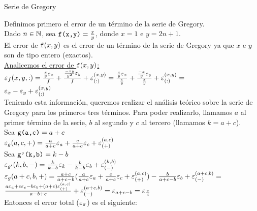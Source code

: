 \begin{section}{Serie de Gregory}

	\large
	
	Definimos primero el error de un término de la serie de Gregory.\\

	Dado $n \in \mathbb{N}$, sea $\texttt{f(x,y)}=\frac{x}{y}$, donde $x=1$ e $y=2n+1$.\\
	
	El error de $\texttt{f}(x,y)$ es el error de un término de la serie de Gregory ya que $x$ e $y$ son de tipo entero (exactos).\\
	
	\underline{Analicemos el error de $\texttt{f}(x,y)$:}\\
	
	$\texttt{$\varepsilon _{f}({x,y,:})$}=\frac{\frac{x}{y}\varepsilon _{x}}{f} + \frac{\frac{-xy}{y^2}\varepsilon _{y}}{f} + \varepsilon _{({:})}^{({x,y})} = 
	\frac{\frac{x}{y}\varepsilon _{x}}{\frac{x}{y}} + \frac{\frac{-x}{y}\varepsilon _{y}}{\frac{x}{y}} + \varepsilon _{({:})}^{({x,y})} =$\\
	
	$\varepsilon _{x} - \varepsilon _{y} + \varepsilon _{({:})}^{({x,y})}$\\
	
	Teniendo esta información, queremos realizar el análisis teórico sobre la serie de Gregory para los primeros tres términos. Para poder realizarlo, llamamos $a$ al primer término de la serie,
	$b$ al segundo y $c$ al tercero (llamamos $k=a+c$).\\
	
	Sea $\texttt{g(a,c)}=a+c$\\
	
	$\varepsilon _{g}({a,c,+}) = \frac{a}{a+c}\varepsilon _{a} + \frac{c}{a+c}\varepsilon _{c} + \varepsilon _{({+})}^{({a,c})}$\\
	
	Sea $\texttt{g'(k,b)}=k-b$\\
	
	$\varepsilon _{g'}({k,b,-}) = \frac{k}{k-b}\varepsilon _{k} - \frac{b}{k-b}\varepsilon _{b} + \varepsilon _{({-})}^{({k,b})}$\\
	
	$\varepsilon _{g}({a+c,b,+}) = \frac{a+c}{a+c-b}(\frac{a}{a+c}\varepsilon _{a} + \frac{c}{a+c}\varepsilon _{c} + \varepsilon _{({+})}^{({a,c})}) - \frac{b}{a+c-b}\varepsilon _{b} + \varepsilon _{({-})}^{({a+c,b})} =$\\
	
	$\frac{a\varepsilon _{a} + c\varepsilon _{c} - b\varepsilon _{b} + (a+c)\varepsilon _{({+})}^{({a,c})}}{a-b+c} + \varepsilon _{({-})}^{({a+c,b})} = \varepsilon _{a+c-b} = \varepsilon _{\frac{\pi}{4}}$\\
	
	Entonces el error total ($\varepsilon _{\pi}$) es el siguiente:\\
	

\end{section}

